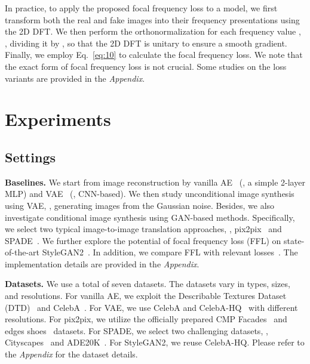 \documentclass[10pt,twocolumn,letterpaper]{article}
\begin{document}
In practice, to apply the proposed focal frequency loss to a model, we first transform both the real and fake images into their frequency presentations using the 2D DFT.
We then perform the orthonormalization for each frequency value , \ie, dividing it by , so that the 2D DFT is unitary to ensure a smooth gradient.
Finally, we employ Eq.~\eqref{eq:10} to calculate the focal frequency loss.
We note that the exact form of focal frequency loss is not crucial.
Some studies on the loss variants are provided in the \textit{Appendix}.









%
 

\section{Experiments}
\label{sec:experiments}





\subsection{Settings}
\label{sec:settings}
\noindent
\textbf{Baselines.}
We start from image reconstruction by vanilla AE~\cite{ae} (\ie, a simple 2-layer MLP) and VAE~\cite{vae} (\ie, CNN-based).
We then study unconditional image synthesis using VAE, \ie, generating images from the Gaussian noise.
Besides, we also investigate conditional image synthesis using GAN-based methods. Specifically, we select two typical image-to-image translation approaches, \ie, pix2pix~\cite{pix2pix} and SPADE~\cite{SPADE}.
We further explore the potential of focal frequency loss (FFL) on state-of-the-art StyleGAN2~\cite{stylegan2}.
In addition, we compare FFL with relevant losses~\cite{perceptualloss,specreg}.
The implementation details are provided in the \textit{Appendix}.











\vspace{0.05cm}
\noindent
\textbf{Datasets.}
We use a total of seven datasets.
The datasets vary in types, sizes, and resolutions.
For vanilla AE, we exploit the Describable Textures Dataset (DTD)~\cite{DTD} and CelebA~\cite{celeba}.
For VAE, we use CelebA and CelebA-HQ~\cite{pggan} with different resolutions.
For pix2pix, we utilize the officially prepared CMP Facades~\cite{cmpfacades} and edges  shoes~\cite{shoesutzappos50K} datasets.
For SPADE, we select two challenging datasets, \ie, Cityscapes~\cite{cityscapes} and ADE20K~\cite{ade20k}.
For StyleGAN2, we reuse CelebA-HQ.
Please refer to the \textit{Appendix} for the dataset details.
\end{document}
